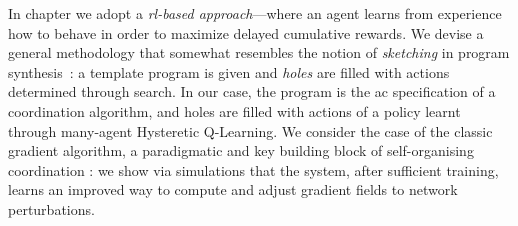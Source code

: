 In chapter we adopt a \emph{\ac{rl}-based approach}---where an agent learns from experience
 how to behave in order to maximize delayed cumulative rewards.
%
We devise a general methodology that somewhat resembles the notion of \emph{sketching} in program synthesis~\cite{solar2008program-synthesis-sketching}:
 a template program is given and \emph{holes} are filled with actions determined through search.
%
In our case, the program is the \ac{ac} specification of a coordination algorithm, and holes are filled with actions of a policy learnt through many-agent Hysteretic Q-Learning.
%
We consider the case of the classic gradient algorithm, 
 a paradigmatic and key building block of self-organising coordination \cite{DBLP:journals/jlap/ViroliBDACP19,beal2013organizing-aggregate,DBLP:journals/corr/abs-2201-03473}: we show via simulations 
 that the system, after sufficient training,
 learns an improved way to compute and adjust gradient fields to network perturbations.
\begin{comment}
\section{Motivation}
The self-healing gradient is a foundational building block, used in several applications, 
ranging from swarm robotics to crowd engineering.
Though working and self-stabilising,
 this algorithm suffers some problems~\cite{DBLP:conf/saso/AudritoCDV17}.
%
One is the \emph{rising value problem} (also known as \emph{count to infinity}): due to the repeated minimisation of all the contributions, 
 the system handles well the situations when the output needs to drop (e.g. a new source enters the system) but it instead reacts slowly when the output needs to rise (e.g. a source node turns off). 
% 
In literature, several heuristics are proposed to tackle the problems of the classical gradient~\cite{DBLP:conf/saso/AudritoCDV17}.
%
%
One of them is CRF (Constraint and Restoring Force)~\cite{DBLP:conf/sac/BealBVT08}. Its goal is to deal with the problem by enforcing a constant rising speed when nodes recognise a local slow rising of the gradient field. 
%
To this end, each node is affected by a set of constraints (i.e. nodes that have a lower gradient value). 
%
If a node finds that it is slowly rising (i.e. there are no more constraints) then it increases its output at a fixed velocity, ignoring its neighbours.
%
Otherwise, the output of the gradient follows the classical formula.
%

Even though these methods show potential, 
 they necessitate an intricate understanding of the environment and meticulous parameter selection for optimal performance. 
 As a solution, we suggest employing \ac{rl} to derive a policy that enhances the gradient algorithm universally.

\end{comment}
